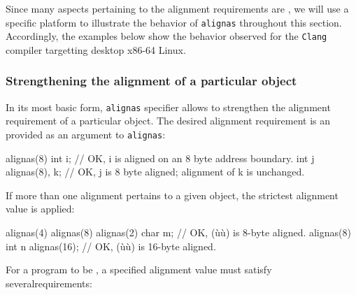 Since many aspects pertaining to the alignment requirements are , we will use a specific platform to illustrate the behavior of \lstinline!alignas! throughout this section.  Accordingly, the examples below show the behavior observed for the \lstinline!Clang! compiler targetting desktop x86-64 Linux.


\subsubsection[Strengthening the alignment of a particular object]{Strengthening the alignment of a particular object}\label{restricting-the-alignment-of-a-particular-object}\label{strengthening-the-alignment-of-a-particular-object}

In its most basic form, \lstinline!alignas! specifier allows to strengthen the alignment requirement of a particular object. The desired alignment requirement is an  provided as an argument to \lstinline!alignas!:

\begin{emcppslisting}
alignas(8) int i;   // OK, i is aligned on an 8 byte address boundary.
int j alignas(8), k; // OK, j is 8 byte aligned; alignment of k is unchanged.
\end{emcppslisting}

\noindent If more than one alignment pertains to a given object, the strictest alignment value is applied:

\begin{emcppslisting}
alignas(4) alignas(8) alignas(2) char m;  // OK, (ù{}ù) is 8-byte aligned.
alignas(8) int n alignas(16);             // OK, (ù{}ù) is 16-byte aligned.
\end{emcppslisting}

\noindent For a program to be , a specified alignment value
must satisfy several\linebreak[4] \mbox{requirements}:

